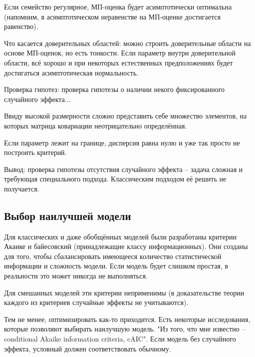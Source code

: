 \documentclass[main.tex]{subfiles}
\begin{document}
Если семейство регулярное, МП-оценка будет асимптотически оптимальна (напомним, в асимптотическом неравенстве на МП-оценке достигается равенство).

Что касается доверительных областей: можно строить доверительные области на основе МП-оценок, но есть тонкости.
Если параметр внутри доверительной области, всё хорошо и при некоторых естественных предположениях будет достигаться асимптотическая нормальность.

Проверка гипотез: проверка гипотезы о наличии некого фиксированного случайного эффекта... %

Ввиду высокой размерности сложно представить себе множество элементов, на которых матрица ковариации неотрицательно определённая.

Если параметр лежит на границе, дисперсия равна нулю и уже так просто не построить критерий.

\begin{leftbar}
	Вывод: проверка гипотезы отсутствия случайного эффекта -- задача сложная и требующая специального подхода.
	Классическим подходом её решить не получается.
\end{leftbar}

\subsection{Выбор наилучшей модели}

Для классических и даже обобщённых моделей были разработаны критерии Акаике и байесовский (принадлежащие классу информационных).
Они созданы для того, чтобы сбалансировать имеющееся количество статистической информации и сложность модели.
Если модель будет слишком простая, в реальности это может никогда не выполняться.

Для смешанных моделей эти критерии неприменимы (в доказательстве теории каждого из критериев случайные эффекты не учитываются).

Тем не менее, оптимизировать как-то приходится.
Есть некоторые исследования, которые позволяют выбирать наилучшую модель.
"Из того, что мне известно -- conditional Akaike information criteria, cAIC".
Если модель без случайного эффекта, условный должен соответствовать обычному.
\end{document}
